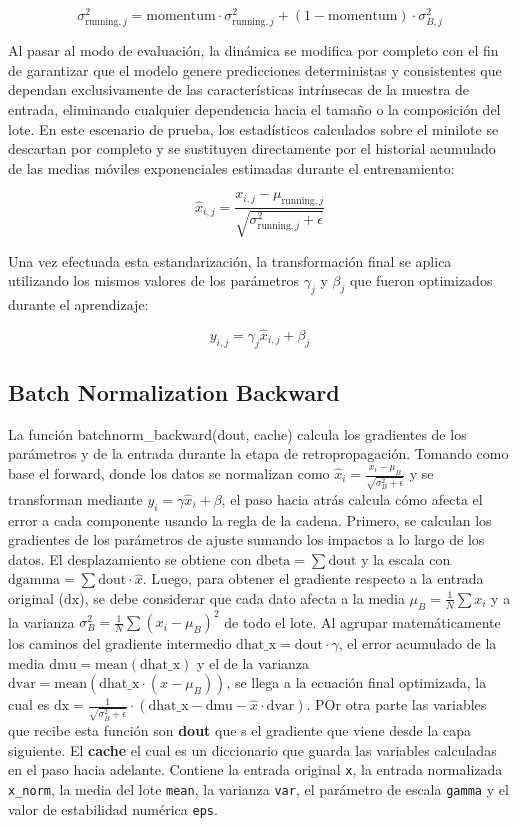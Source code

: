 \documentclass[12pt]{article}
\begin{document}
$$\sigma_{\text{running},j}^2 = \text{momentum} \cdot \sigma_{\text{running},j}^2 + (1 - \text{momentum}) \cdot \sigma_{B,j}^2$$

Al pasar al modo de evaluación, la dinámica se modifica por completo con el fin de 
garantizar que el modelo genere predicciones deterministas y consistentes que dependan 
exclusivamente de las características intrínsecas de la muestra de entrada, eliminando 
cualquier dependencia hacia el tamaño o la composición del lote. En este escenario de 
prueba, los estadísticos calculados sobre el minilote se descartan por completo y se 
sustituyen directamente por el historial acumulado de las medias móviles exponenciales 
estimadas durante el entrenamiento:

$$\hat{x}_{i,j} = \frac{x_{i,j} - \mu_{\text{running},j}}{\sqrt{\sigma_{\text{running},j}^2 + \epsilon}}$$

Una vez efectuada esta estandarización, la transformación final se aplica utilizando 
los mismos valores de los parámetros $\gamma_j$ y $\beta_j$ que fueron optimizados 
durante el aprendizaje:

$$y_{i,j} = \gamma_j \hat{x}_{i,j} + \beta_j$$


\subsection{Batch Normalization Backward}

La función batchnorm\_backward(dout, cache) calcula los gradientes de los parámetros y de la entrada durante la etapa de retropropagación. 
Tomando como base el forward, donde los datos se normalizan como $\hat{x}_i = \frac{x_i - \mu_B}{\sqrt{\sigma_B^2 + \epsilon}}$ y se 
transforman mediante $y_i = \gamma \hat{x}_i + \beta$, el paso hacia atrás calcula cómo afecta el error a cada componente usando la regla de la cadena. 
Primero, se calculan los gradientes de los parámetros de ajuste sumando los impactos a lo largo de los datos. 
El desplazamiento se obtiene con $\text{dbeta} = \sum \text{dout}$ y la escala con $\text{dgamma} = \sum \text{dout} \cdot \hat{x}$. 
Luego, para obtener el gradiente respecto a la entrada original ($\text{dx}$), se debe considerar
que cada dato afecta a la media $\mu_B = \frac{1}{N}\sum x_i$ y a la varianza $\sigma_B^2 = \frac{1}{N}\sum (x_i - \mu_B)^2$ de todo el lote.
Al agrupar matemáticamente los caminos del gradiente intermedio $\text{dhat\_x} = \text{dout} \cdot \gamma$, el error acumulado de la 
media $\text{dmu} = \text{mean}(\text{dhat\_x})$ y el de la varianza $\text{dvar} = \text{mean}(\text{dhat\_x} \cdot (x - \mu_B))$, se llega a la 
ecuación final optimizada, la cual es $\text{dx} = \frac{1}{\sqrt{\sigma_B^2 + \epsilon}} \cdot (\text{dhat\_x} - \text{dmu} - \hat{x} \cdot \text{dvar})$.
POr otra parte las variables que recibe esta función son \textbf{dout} que s el gradiente que viene desde la capa 
siguiente. El \textbf{cache} el cual es un diccionario que guarda las variables calculadas en el paso hacia adelante. 
Contiene la entrada original \texttt{x}, la entrada normalizada \texttt{x\_norm}, la media del lote \texttt{mean}, 
la varianza \texttt{var}, el parámetro de escala \texttt{gamma} y el valor de estabilidad numérica \texttt{eps}.
\end{document}
